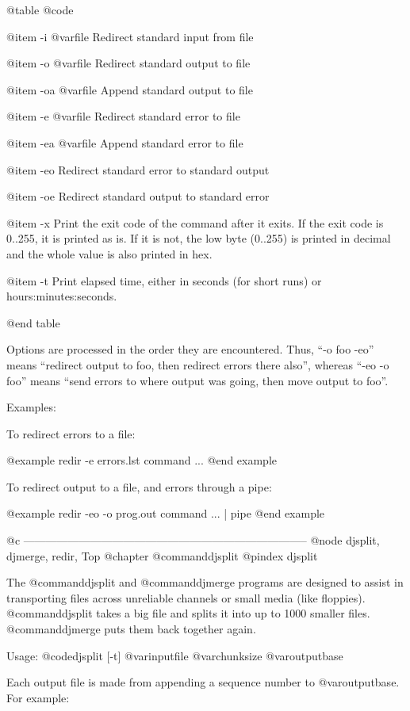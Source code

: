 @table @code

@item -i @var{file}
Redirect standard input from file

@item -o @var{file}
Redirect standard output to file

@item -oa @var{file}
Append standard output to file

@item -e @var{file}
Redirect standard error to file

@item -ea @var{file}
Append standard error to file

@item -eo
Redirect standard error to standard output

@item -oe
Redirect standard output to standard error

@item -x
Print the exit code of the command after it exits.  If the exit code is
0..255, it is printed as is.  If it is not, the low byte (0..255) is
printed in decimal and the whole value is also printed in hex.

@item -t
Print elapsed time, either in seconds (for short runs) or
hours:minutes:seconds.

@end table

Options are processed in the order they are encountered.  Thus, ``-o foo
-eo'' means ``redirect output to foo, then redirect errors there also'',
whereas ``-eo -o foo'' means ``send errors to where output was going, then
move output to foo''.


Examples:

To redirect errors to a file:

@example
redir -e errors.lst command ...
@end example

To redirect output to a file, and errors through a pipe:

@example
redir -eo -o prog.out command ... | pipe
@end example

@c -----------------------------------------------------------------------------
@node djsplit, djmerge, redir, Top
@chapter @command{djsplit}
@pindex djsplit

The @command{djsplit} and @command{djmerge} programs are designed to assist in
transporting files across unreliable channels or small media (like
floppies).  @command{djsplit} takes a big file and splits it into up to 1000
smaller files.  @command{djmerge} puts them back together again.

Usage: @code{djsplit [-t] @var{inputfile} @var{chunksize} @var{outputbase}}

Each output file is made from appending a sequence number to
@var{outputbase}.  For example:

